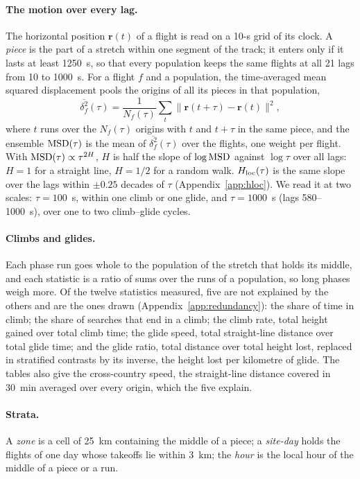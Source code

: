 \paragraph{The motion over every lag.} The horizontal position $\mathbf r(t)$ of a flight is read on
a 10-s grid of its clock. A \emph{piece} is the part of a stretch within one segment of the track; it
enters only if it lasts at least 1250~s, so that every population keeps the same flights at all 21
lags from 10 to 1000~s. For a flight $f$ and a population, the time-averaged mean squared
displacement pools the origins of all its pieces in that population,
\begin{equation}\label{eq:tamsd}
  \overline{\delta^2_f}(\tau)=\frac{1}{N_f(\tau)}\sum_{t}\bigl\|\mathbf r(t+\tau)-\mathbf r(t)\bigr\|^2 ,
\end{equation}
where $t$ runs over the $N_f(\tau)$ origins with $t$ and $t+\tau$ in the same piece, and the
ensemble $\mathrm{MSD}(\tau)$ is the mean of $\overline{\delta^2_f}(\tau)$ over the flights, one weight per
flight. With $\mathrm{MSD}(\tau)\propto\tau^{2H}$, $H$ is half the slope of $\log\mathrm{MSD}$ against $\log\tau$ over
all lags: $H=1$ for a straight line, $H=1/2$ for a random walk. $H_\mathrm{loc}(\tau)$ is the same slope over
the lags within $\pm0.25$ decades of $\tau$ (Appendix~\ref{app:hloc}). We read it at two scales:
$\tau=100$~s, within one climb or one glide, and $\tau=1000$~s (lags 580--1000~s), over one to two
climb--glide cycles.

\paragraph{Climbs and glides.} Each phase run goes whole to the population of the stretch that holds
its middle, and each statistic is a ratio of sums over the runs of a population, so long phases weigh
more. Of the twelve statistics measured, five are not explained by the others and are the ones drawn
(Appendix~\ref{app:redundancy}): the share of time in climb; the share of searches that end in a
climb; the climb rate, total height gained over total climb time; the glide speed, total
straight-line distance over total glide time; and the glide ratio, total distance over total height
lost, replaced in stratified contrasts by its inverse, the height lost per kilometre of glide. The
tables also give the cross-country speed, the straight-line distance covered in 30~min averaged over
every origin, which the five explain.

\paragraph{Strata.} A \emph{zone} is a cell of 25~km containing the middle of a piece; a
\emph{site-day} holds the flights of one day whose takeoffs lie within 3~km; the \emph{hour} is the
local hour of the middle of a piece or a run.

